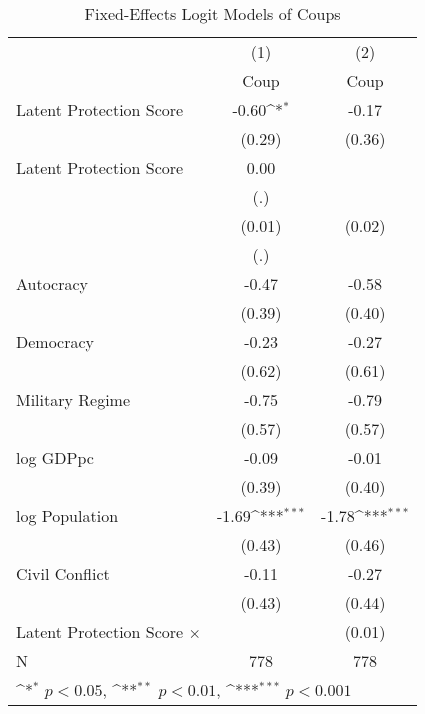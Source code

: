 \begin{table}[htbp]\centering
\def\sym#1{\ifmmode^{#1}\else\(^{#1}\)\fi}
\caption{\label{tab1} Fixed-Effects Logit Models of Coups}
\begin{tabular}{l*{2}{c}}
\hline\hline
                    &\multicolumn{1}{c}{(1)}         &\multicolumn{1}{c}{(2)}         \\
                    &        Coup         &        Coup         \\
\hline
Latent Protection Score&       -0.60\sym{*}  &       -0.17         \\
                    &      (0.29)         &      (0.36)         \\
Latent Protection Score&        0.00         &                     \\
                    &         (.)         &                     \\
                    &      (0.01)         &      (0.02)         \\
                    &         (.)         &                     \\
Autocracy           &       -0.47         &       -0.58         \\
                    &      (0.39)         &      (0.40)         \\
Democracy           &       -0.23         &       -0.27         \\
                    &      (0.62)         &      (0.61)         \\
Military Regime     &       -0.75         &       -0.79         \\
                    &      (0.57)         &      (0.57)         \\
log GDPpc           &       -0.09         &       -0.01         \\
                    &      (0.39)         &      (0.40)         \\
log Population      &       -1.69\sym{***}&       -1.78\sym{***}\\
                    &      (0.43)         &      (0.46)         \\
Civil Conflict      &       -0.11         &       -0.27         \\
                    &      (0.43)         &      (0.44)         \\
Latent Protection Score $\times$ %
                    &                     &      (0.01)         \\
\hline
N                   &         778         &         778         \\
\hline\hline
\multicolumn{3}{l}{\footnotesize \sym{*} \(p<0.05\), \sym{**} \(p<0.01\), \sym{***} \(p<0.001\)}\\
\end{tabular}
\end{table}
